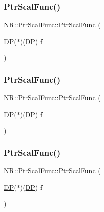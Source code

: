 \subsubsection{\texorpdfstring{PtrScalFunc()}{PtrScalFunc()}\hspace{0.1cm}{\footnotesize\ttfamily [1/3]}}
{\footnotesize\ttfamily N\+R\+::\+Ptr\+Scal\+Func\+::\+Ptr\+Scal\+Func (\begin{DoxyParamCaption}\item[{\mbox{\hyperlink{namespaceNR_af6ff762dd605ff477b8e52387253a02a}{DP}}($\ast$)(\mbox{\hyperlink{namespaceNR_af6ff762dd605ff477b8e52387253a02a}{DP}})}]{f }\end{DoxyParamCaption})\hspace{0.3cm}{\ttfamily [inline]}}

\mbox{\label{classNR_1_1PtrScalFunc_aa3e7954dd902a46c492bd39d4c21a71c}} 
\subsubsection{\texorpdfstring{PtrScalFunc()}{PtrScalFunc()}\hspace{0.1cm}{\footnotesize\ttfamily [2/3]}}
{\footnotesize\ttfamily N\+R\+::\+Ptr\+Scal\+Func\+::\+Ptr\+Scal\+Func (\begin{DoxyParamCaption}\item[{\mbox{\hyperlink{namespaceNR_af6ff762dd605ff477b8e52387253a02a}{DP}}($\ast$)(\mbox{\hyperlink{namespaceNR_af6ff762dd605ff477b8e52387253a02a}{DP}})}]{f }\end{DoxyParamCaption})\hspace{0.3cm}{\ttfamily [inline]}}

\mbox{\label{classNR_1_1PtrScalFunc_aa3e7954dd902a46c492bd39d4c21a71c}} 
\subsubsection{\texorpdfstring{PtrScalFunc()}{PtrScalFunc()}\hspace{0.1cm}{\footnotesize\ttfamily [3/3]}}
{\footnotesize\ttfamily N\+R\+::\+Ptr\+Scal\+Func\+::\+Ptr\+Scal\+Func (\begin{DoxyParamCaption}\item[{\mbox{\hyperlink{namespaceNR_af6ff762dd605ff477b8e52387253a02a}{DP}}($\ast$)(\mbox{\hyperlink{namespaceNR_af6ff762dd605ff477b8e52387253a02a}{DP}})}]{f }\end{DoxyParamCaption})\hspace{0.3cm}{\ttfamily [inline]}}



